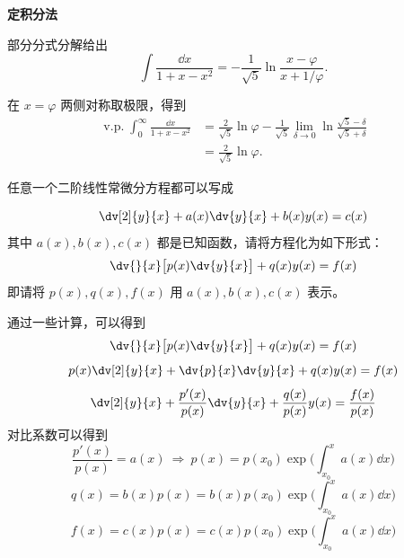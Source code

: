 \begin{question}
\begin{solution}
\begin{enumerate}
\textbf{定积分法}\par

部分分式分解给出
\[
\int\frac{\dd{x}}{1+x-x^2}
=-\frac1{\sqrt5}\ln\frac{x-\varphi}{x+1/\varphi}.
\]

在 \(x=\varphi\) 两侧对称取极限，得到
\[
\begin{aligned}
\operatorname{v.p.}\int_0^\infty\frac{\dd{x}}{1+x-x^2}
&=\frac{2}{\sqrt5}\ln\varphi
-\frac1{\sqrt5}\lim_{\delta\to0}
\ln\frac{\sqrt5-\delta}{\sqrt5+\delta}\\
&=\frac{2}{\sqrt5}\ln\varphi.
\end{aligned}
\]
\end{enumerate}
\end{solution}
\end{question}

\begin{question}
任意一个二阶线性常微分方程都可以写成

\[ \dv[2]{y}{x}+a(x)\dv{y}{x}+b(x)y(x)=c(x) \]
其中 \(a(x),b(x),c(x)\) 都是已知函数，请将方程化为如下形式：
\[ \dv{}{x}\bigl[p(x)\dv{y}{x}\bigr] + q(x)y(x)=f(x) \]
即请将 \(p(x),q(x),f(x)\) 用 \(a(x),b(x),c(x)\) 表示。
\begin{solution}
通过一些计算，可以得到
\[ \dv{}{x}\bigl[p(x)\dv{y}{x}\bigr] + q(x)y(x)=f(x) \] \[ p(x)\dv[2]{y}{x}+\dv{p}{x}\dv{y}{x}+q(x)y(x)=f(x) \] \[ \dv[2]{y}{x}+\frac{p'(x)}{p(x)}\dv{y}{x}+\frac{q(x)}{p(x)}y(x)=\frac{f(x)}{p(x)} \]
对比系数可以得到 \[ \frac{p'(x)}{p(x)}=a(x)\ \Rightarrow\ p(x)=p(x_0)\exp\biggl(\int_{x_0}^x a(x)\dd{x}\biggr) \] \[ q(x)=b(x)p(x)=b(x)p(x_0)\exp\biggl(\int_{x_0}^x a(x)\dd{x}\biggr) \] \[ f(x)=c(x)p(x)=c(x)p(x_0)\exp\biggl(\int_{x_0}^x a(x)\dd{x}\biggr) \]
\end{solution}
\end{question}


